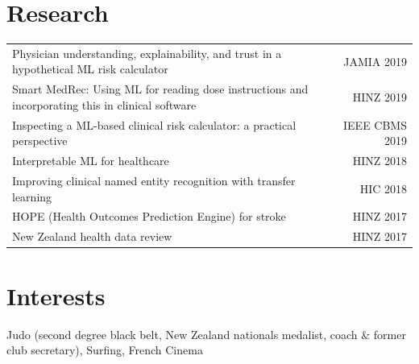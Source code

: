 \documentclass[letterpaper,11pt]{article}
\begin{document}
\section{Research} 
\begin{tabular*}{\textwidth}{l@{\extracolsep{\fill}}r}
{\small Physician understanding, explainability, and trust in a hypothetical ML risk calculator} & {\small JAMIA 2019}\\
{\small Smart MedRec: Using ML for reading dose instructions and incorporating this in clinical software} & {\small HINZ 2019}\\
{\small Inspecting a ML-based clinical risk calculator: a practical perspective} & {\small IEEE CBMS 2019}\\
{\small Interpretable ML for healthcare} & {\small HINZ 2018}\\
{\small Improving clinical named entity recognition with transfer learning} & {\small HIC 2018}\\
{\small HOPE (Health Outcomes Prediction Engine) for stroke} & {\small HINZ 2017}\\
{\small New Zealand health data review} & {\small HINZ 2017}\\
\end{tabular*}



\section{Interests}
{\small Judo (second degree black belt, New Zealand nationals medalist, coach \& former club secretary)}, {\small Surfing}, {\small French Cinema}
\end{document}
